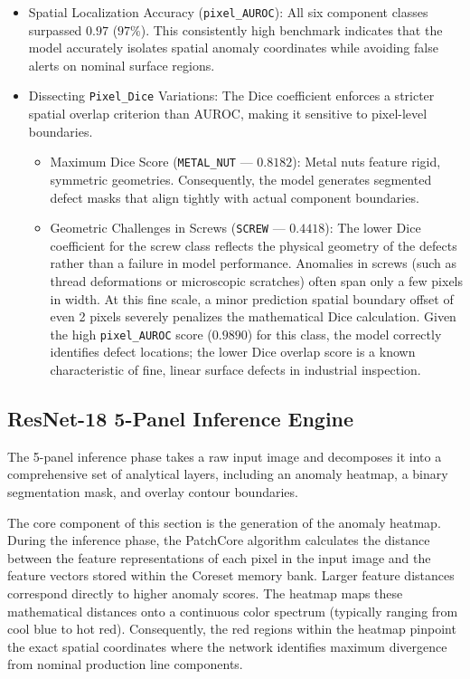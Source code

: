 \documentclass{article}
\begin{document}
\begin{itemize}
	\item Spatial Localization Accuracy (\texttt{pixel\_AUROC}): All six component classes surpassed $0.97$ ($97\%$). This consistently high benchmark indicates that the model accurately isolates spatial anomaly coordinates while avoiding false alerts on nominal surface regions.
	
	\item Dissecting \texttt{Pixel\_Dice} Variations: The Dice coefficient enforces a stricter spatial overlap criterion than AUROC, making it sensitive to pixel-level boundaries.
	\begin{itemize}
		\item Maximum Dice Score (\texttt{METAL\_NUT} — $0.8182$): Metal nuts feature rigid, symmetric geometries. Consequently, the model generates segmented defect masks that align tightly with actual component boundaries.
		\item Geometric Challenges in Screws (\texttt{SCREW} — $0.4418$): The lower Dice coefficient for the screw class reflects the physical geometry of the defects rather than a failure in model performance. Anomalies in screws (such as thread deformations or microscopic scratches) often span only a few pixels in width. At this fine scale, a minor prediction spatial boundary offset of even 2 pixels severely penalizes the mathematical Dice calculation. Given the high \texttt{pixel\_AUROC} score ($0.9890$) for this class, the model correctly identifies defect locations; the lower Dice overlap score is a known characteristic of fine, linear surface defects in industrial inspection.
	\end{itemize}
\end{itemize}

\subsection{ResNet-18 5-Panel Inference Engine}
\label{subsec:5Panel}

The 5-panel inference phase takes a raw input image and decomposes it into a comprehensive set of analytical layers, including an anomaly heatmap, a binary segmentation mask, and overlay contour boundaries.

The core component of this section is the generation of the anomaly heatmap. During the inference phase, the PatchCore algorithm calculates the distance between the feature representations of each pixel in the input image and the feature vectors stored within the Coreset memory bank. Larger feature distances correspond directly to higher anomaly scores. The heatmap maps these mathematical distances onto a continuous color spectrum (typically ranging from cool blue to hot red). Consequently, the red regions within the heatmap pinpoint the exact spatial coordinates where the network identifies maximum divergence from nominal production line components.
\end{document}
